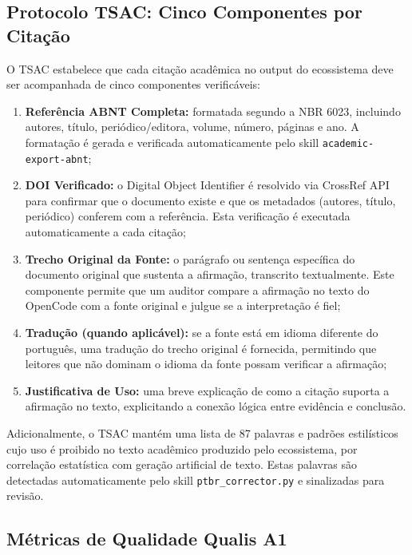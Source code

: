 \documentclass[12pt,a4paper,sumario=tradicional,openany]{abntex2}
\begin{document}
\subsection{Protocolo TSAC: Cinco Componentes por Citação}

O TSAC estabelece que cada citação acadêmica no output do ecossistema deve ser acompanhada de cinco componentes verificáveis:

\begin{enumerate}[leftmargin=*]
    \item \textbf{Referência ABNT Completa:} formatada segundo a NBR 6023, incluindo autores, título, periódico/editora, volume, número, páginas e ano. A formatação é gerada e verificada automaticamente pelo skill \texttt{academic-export-abnt};
    \item \textbf{DOI Verificado:} o Digital Object Identifier é resolvido via CrossRef API para confirmar que o documento existe e que os metadados (autores, título, periódico) conferem com a referência. Esta verificação é executada automaticamente a cada citação;
    \item \textbf{Trecho Original da Fonte:} o parágrafo ou sentença específica do documento original que sustenta a afirmação, transcrito textualmente. Este componente permite que um auditor compare a afirmação no texto do OpenCode com a fonte original e julgue se a interpretação é fiel;
    \item \textbf{Tradução (quando aplicável):} se a fonte está em idioma diferente do português, uma tradução do trecho original é fornecida, permitindo que leitores que não dominam o idioma da fonte possam verificar a afirmação;
    \item \textbf{Justificativa de Uso:} uma breve explicação de como a citação suporta a afirmação no texto, explicitando a conexão lógica entre evidência e conclusão.
\end{enumerate}

Adicionalmente, o TSAC mantém uma lista de 87 palavras e padrões estilísticos cujo uso é proibido no texto acadêmico produzido pelo ecossistema, por correlação estatística com geração artificial de texto. Estas palavras são detectadas automaticamente pelo skill \texttt{ptbr\_corrector.py} e sinalizadas para revisão.

\subsection{Métricas de Qualidade Qualis A1}
\end{document}
